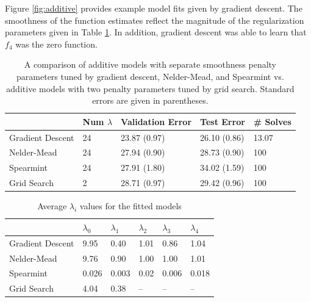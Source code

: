 \documentclass[12pt]{article}
\begin{document}
Figure \ref{fig:additive} provides example model fits given by gradient descent. The smoothness of the function estimates reflect the magnitude of the regularization parameters given in Table \ref{tab:additive}. In addition, gradient descent was able to learn that $f_4$ was the zero function.

\begin{table}
\caption {\label{tab:additive} A comparison of additive models with separate smoothness penalty parameters tuned by gradient descent, Nelder-Mead, and Spearmint vs. additive models with two penalty parameters tuned by grid search. Standard errors are given in parentheses.}
\centering
\begin{tabular}{| l | l | l | l | l | }
\hline
& Num $\lambda$ & Validation Error & Test Error & \# Solves\\
\hline
Gradient Descent & 24 & 23.87 (0.97) & 26.10 (0.86) & 13.07 \\
\hline
Nelder-Mead & 24 & 27.94 (0.90) & 28.73 (0.90) & 100 \\
\hline
Spearmint & 24 & 27.91 (1.80) & 34.02 (1.59) & 100 \\
\hline
Grid Search & 2 & 28.71 (0.97) & 29.42 (0.96) & 100 \\
\hline
\end{tabular}
\end{table}

\begin{table}
\caption {\label{tab:additive_average_lambda} Average $\lambda_i$ values for the fitted models}
\centering
\begin{tabular}{| l | l | l | l | l | l | }
\hline
& $\lambda_0$ & $\lambda_1$ & $\lambda_2$ & $\lambda_3$ & $\lambda_4$\\
\hline
Gradient Descent & 9.95 & 0.40 & 1.01 & 0.86 & 1.04 \\
\hline
Nelder-Mead & 9.76 & 0.90 & 1.00 & 1.00 & 1.01 \\
\hline
Spearmint & 0.026 & 0.003 & 0.02 & 0.006 & 0.018\\
\hline
Grid Search & 4.04 & 0.38 & -- & -- & -- \\
\hline
\end{tabular}
\end{table}
\end{document}
